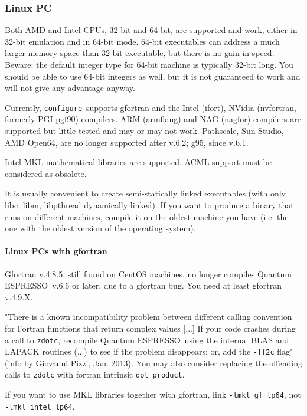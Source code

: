 \documentclass[12pt,a4paper]{article}
\def\qe{{\sc Quantum ESPRESSO}}
\def\configure{\texttt{configure}}
\begin{document}
\subsubsection{Linux PC}

Both AMD and Intel CPUs, 32-bit and 64-bit, are supported and work,
either in 32-bit emulation and in 64-bit mode. 64-bit executables
can address a much larger memory space than 32-bit executable, but
there is no gain in speed.
Beware: the default integer type for 64-bit machine is typically
32-bit long. You should be able to use 64-bit integers as well,
but it is not guaranteed to work and will not give
any advantage anyway.

Currently, \configure\ supports gfortran and the Intel (ifort), NVidia
(nvfortran, formerly PGI pgf90) compilers. ARM (armflang) and NAG (nagfor)
compilers are supported but little tested and may or may not work.
Pathscale, Sun Studio, AMD Open64, are no longer supported after v.6.2;
g95, since v.6.1.

Intel MKL mathematical libraries are supported. ACML support must be
considered as obsolete.

It is usually convenient to create semi-statically linked executables (with only
libc, libm, libpthread dynamically linked). If you want to produce a binary
that runs on different machines, compile it on the oldest machine you have
(i.e. the one with the oldest version of the operating system).

\paragraph{Linux PCs with gfortran}

Gfortran v.4.8.5, still found on CentOS machines, no longer compiles
\qe\ v.6.6 or later, due to a gfortran bug. You need at least gfortran v.4.9.X.

"There is a known incompatibility problem between different calling
convention for Fortran functions that return complex values [...]
If your code crashes during a call to \texttt{zdotc},
recompile \qe\ using the internal BLAS and LAPACK routines
(...)
to see if the problem disappears; or, add the \texttt{-ff2c} flag"
(info by Giovanni Pizzi, Jan. 2013).
You may also consider replacing the offending calls to \texttt{zdotc}
with fortran intrinsic \texttt{dot\_product}.

If you want to use MKL libraries together with gfortran,
link \texttt{-lmkl\_gf\_lp64}, not \texttt{-lmkl\_intel\_lp64}.
\end{document}
